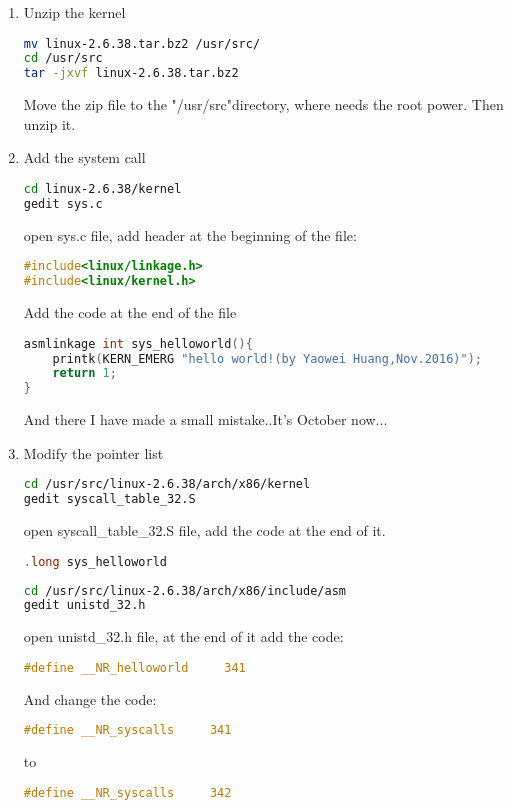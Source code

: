 \documentclass[12pt,a4paper]{article}
\begin{document}
\begin{enumerate}

\item Unzip the kernel
\begin{lstlisting}[language=bash]
mv linux-2.6.38.tar.bz2 /usr/src/
cd /usr/src
tar -jxvf linux-2.6.38.tar.bz2
\end{lstlisting} 

\quad Move the zip file to the "/usr/src"directory, where needs the root power. Then unzip it.

\item Add the system call
\begin{lstlisting}[language=bash]
cd linux-2.6.38/kernel
gedit sys.c
\end{lstlisting}
\quad open sys.c file, add header at the beginning of the file:
\begin{lstlisting}[language=C]
#include<linux/linkage.h>
#include<linux/kernel.h>
\end{lstlisting}
\quad Add the code at the end of the file
\begin{lstlisting}[language=C]
asmlinkage int sys_helloworld(){
	printk(KERN_EMERG "hello world!(by Yaowei Huang,Nov.2016)");
	return 1;
}
\end{lstlisting}
\quad And there I have made a small mistake..It's October now...

\item Modify the pointer list
\begin{lstlisting}[language=bash]
cd /usr/src/linux-2.6.38/arch/x86/kernel
gedit syscall_table_32.S
\end{lstlisting} 
\quad open syscall\_table\_32.S file, add the code at the end of it.
\begin{lstlisting}[language=C]
.long sys_helloworld
\end{lstlisting}
\begin{lstlisting}[language=bash]
cd /usr/src/linux-2.6.38/arch/x86/include/asm
gedit unistd_32.h
\end{lstlisting}
\quad open unistd\_32.h file, at the end of it add the code:
\begin{lstlisting}[language=C]
#define __NR_helloworld     341
\end{lstlisting}
\quad And change the code:
\begin{lstlisting}[language=C]
#define __NR_syscalls     341
\end{lstlisting}
\quad to
\begin{lstlisting}[language=C]
#define __NR_syscalls     342
\end{lstlisting}
\end{enumerate}
\end{document}
